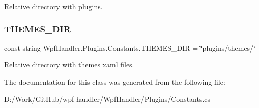 Relative directory with plugins. 

\mbox{\label{class_wpf_handler_1_1_plugins_1_1_constants_aa7969fd3e77b585b42f0c99a5440dbb2}} 
\subsubsection{\texorpdfstring{T\+H\+E\+M\+E\+S\+\_\+\+D\+IR}{THEMES\_DIR}}
{\footnotesize\ttfamily const string Wpf\+Handler.\+Plugins.\+Constants.\+T\+H\+E\+M\+E\+S\+\_\+\+D\+IR = \char`\"{}plugins/themes/\char`\"{}}



Relative directory with themes xaml files. 



The documentation for this class was generated from the following file\+:\begin{DoxyCompactItemize}
\item 
D\+:/\+Work/\+Git\+Hub/wpf-\/handler/\+Wpf\+Handler/\+Plugins/Constants.\+cs\end{DoxyCompactItemize}
